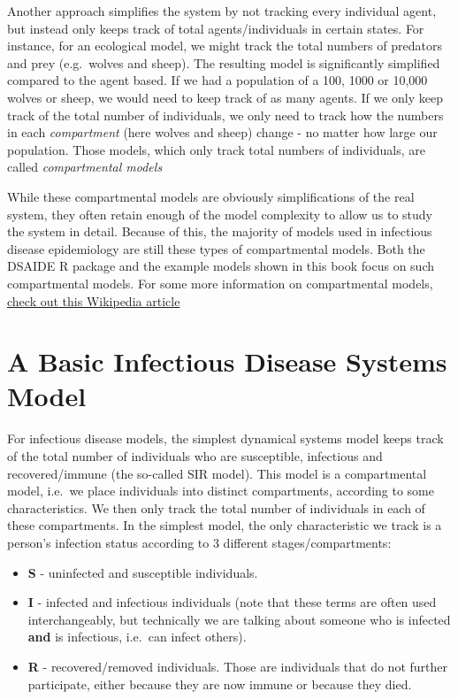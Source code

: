 \documentclass[]{book}
\providecommand{\tightlist}{%
  \setlength{\itemsep}{0pt}\setlength{\parskip}{0pt}}
\theoremstyle{definition}
\theoremstyle{definition}
\theoremstyle{definition}
\theoremstyle{remark}
\begin{document}
Another approach simplifies the system by not tracking every individual
agent, but instead only keeps track of total agents/individuals in
certain states. For instance, for an ecological model, we might track
the total numbers of predators and prey (e.g.~wolves and sheep). The
resulting model is significantly simplified compared to the agent based.
If we had a population of a 100, 1000 or 10,000 wolves or sheep, we
would need to keep track of as many agents. If we only keep track of the
total number of individuals, we only need to track how the numbers in
each \emph{compartment} (here wolves and sheep) change - no matter how
large our population. Those models, which only track total numbers of
individuals, are called \emph{compartmental models}

While these compartmental models are obviously simplifications of the
real system, they often retain enough of the model complexity to allow
us to study the system in detail. Because of this, the majority of
models used in infectious disease epidemiology are still these types of
compartmental models. Both the DSAIDE R package and the example models
shown in this book focus on such compartmental models. For some more
information on compartmental models,
\href{https://en.wikipedia.org/wiki/Compartmental_models_in_epidemiology}{check
out this Wikipedia article}

\section{A Basic Infectious Disease Systems
Model}\label{a-basic-infectious-disease-systems-model}

For infectious disease models, the simplest dynamical systems model
keeps track of the total number of individuals who are susceptible,
infectious and recovered/immune (the so-called SIR model). This model is
a compartmental model, i.e.~we place individuals into distinct
compartments, according to some characteristics. We then only track the
total number of individuals in each of these compartments. In the
simplest model, the only characteristic we track is a person's infection
status according to 3 different stages/compartments:

\begin{itemize}
\tightlist
\item
  \textbf{S} - uninfected and susceptible individuals.
\item
  \textbf{I} - infected and infectious individuals (note that these
  terms are often used interchangeably, but technically we are talking
  about someone who is infected \textbf{and} is infectious, i.e.~can
  infect others).
\item
  \textbf{R} - recovered/removed individuals. Those are individuals that
  do not further participate, either because they are now immune or
  because they died.
\end{itemize}
\end{document}
